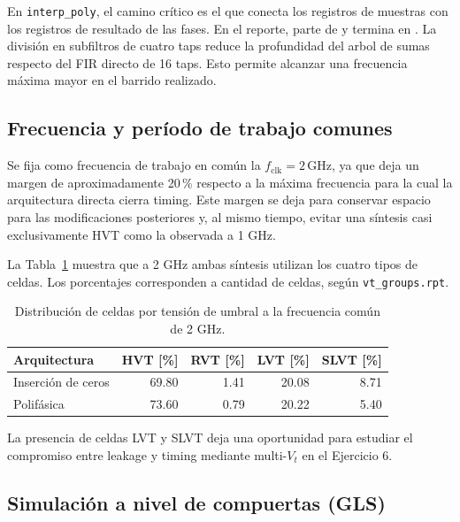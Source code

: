 \documentclass[10pt,a4paper]{article}
\begin{document}
En \texttt{interp\_poly}, el camino crítico es el que conecta los registros
de muestras con los registros de resultado de las fases. En el reporte,
parte de  y termina en
. La división en subfiltros de cuatro 
taps reduce la profundidad del arbol de sumas respecto del FIR directo de 16 
taps. Esto permite alcanzar una frecuencia máxima mayor en el barrido realizado.


\subsection{Frecuencia y período de trabajo comunes}
\label{sec:periodo-comun}

Se fija como frecuencia de trabajo en común la $f_{\mathrm{clk}}=2\,\mathrm{GHz}$,
ya que deja un margen de aproximadamente 20\,\% respecto a la máxima frecuencia 
para la cual la arquitectura directa cierra timing. Este margen se deja para 
conservar espacio para las modificaciones posteriores y, al mismo tiempo, evitar 
una síntesis  casi exclusivamente HVT como la observada a 1 GHz.

La Tabla~\ref{tab:vt-trabajo} muestra que a 2 GHz ambas síntesis utilizan los cuatro
tipos de celdas. Los porcentajes corresponden a cantidad de celdas, según
\texttt{vt\_groups.rpt}.

\begin{table}[H]
    \centering
    \caption{Distribución de celdas por tensión de umbral a la frecuencia común de 2 GHz.}
    \label{tab:vt-trabajo}
    \begin{tabular}{@{}lrrrr@{}}
        \toprule
        \textbf{Arquitectura} & HVT [\%] & RVT [\%] & LVT [\%] & SLVT [\%] \\
        \midrule
        Inserción de ceros & 69.80 & 1.41 & 20.08 & 8.71 \\
        Polifásica        & 73.60 & 0.79 & 20.22 & 5.40 \\
        \bottomrule
    \end{tabular}
\end{table}

La presencia de celdas LVT y SLVT deja una oportunidad para estudiar el compromiso
entre leakage y timing mediante multi-$V_t$ en el Ejercicio 6.

\subsection{Simulación a nivel de compuertas (GLS)}
\label{sec:gls}
\end{document}
